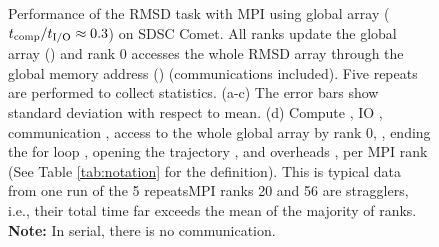 \begin{figure}[ht!]
\caption{Performance of the RMSD task with MPI using global array (${t}_{\text{comp}}/{t}_{\text{I/O}} \approx 0.3$) on SDSC Comet.
All ranks update the global array () and rank 0 accesses the whole RMSD array through the global memory address () (communications included).
Five repeats are performed to collect statistics. (a-c) The error bars show standard deviation with respect to mean. 
(d) Compute \tcomp, IO \tIO, communication \tcomm, access to the whole global array by rank 0, , ending the for loop , 
opening the trajectory , and overheads , 
 per MPI rank (See Table \ref{tab:notation} for the definition). This is typical data from one run of the 5 repeatsMPI ranks 20 and 56 are stragglers, i.e., 
their total time far exceeds the mean of the majority of ranks. \textbf{Note:} In serial, there is no communication.}
\label{fig:MPIwithIO-ga4py}
\end{figure}


